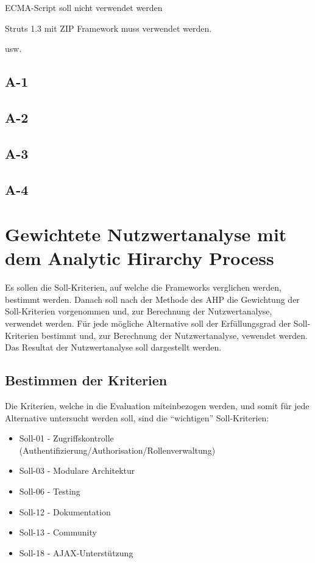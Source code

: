   ECMA-Script soll nicht verwendet werden
  
  Struts 1.3 mit ZIP Framework muss verwendet werden.
  
  usw.
  
  \subsection{A-1}
  
  \subsection{A-2}
  
  \subsection{A-3}

  \subsection{A-4}
    
  \section{Gewichtete Nutzwertanalyse mit dem Analytic Hirarchy Process}
  
  Es sollen die Soll-Kriterien, auf welche die Frameworks verglichen werden,
  bestimmt werden. Danach soll nach der Methode des \ac{AHP} die Gewichtung der
  Soll-Kriterien vorgenommen und, zur Berechnung der Nutzwertanalyse,
  verwendet werden. Für jede mögliche Alternative soll der Erfüllungsgrad der
  Soll-Kriterien bestimmt und, zur Berechnung der Nutzwertanalyse, vewendet
  werden. Das Resultat der Nutzwertanalyse soll dargestellt werden.
  
  \subsection{Bestimmen der Kriterien}
  
  Die Kriterien, welche in die Evaluation miteinbezogen werden, und somit für
  jede Alternative untersucht werden soll, sind die ``wichtigen''
  Soll-Kriterien:
  
  \begin{itemize}
    \item Soll-01 - Zugriffskontrolle 
    (Authentifizierung/Authorisation/Rollenverwaltung)
    \item Soll-03 - Modulare Architektur
    \item Soll-06 - Testing
    \item Soll-12 - Dokumentation
    \item Soll-13 - Community
    \item Soll-18 - AJAX-Unterstützung
  \end{itemize}
  
